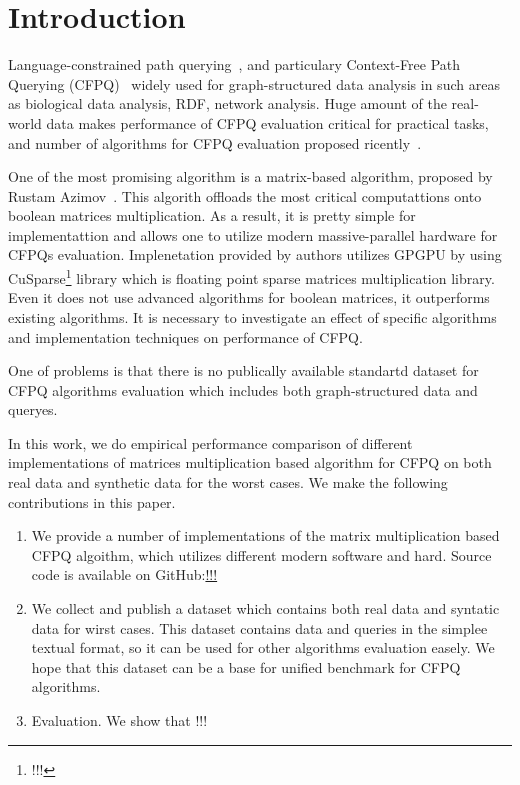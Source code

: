 \section{Introduction}

Language-constrained path querying~\cite{!!!}, and particulary Context-Free Path Querying (CFPQ)~\cite{!!!} widely used for graph-structured data analysis in such areas as biological data analysis, RDF, network analysis.
Huge amount of the real-world data makes performance of CFPQ evaluation critical for practical tasks, and number of algorithms for CFPQ evaluation proposed ricently~\cite{!!!}.

One of the most promising algorithm is a matrix-based algorithm, proposed by Rustam Azimov~\cite{!!!}.
This algorith offloads the most critical computattions onto boolean matrices multiplication.
As a result, it is pretty simple for implementattion and allows one to utilize modern massive-parallel hardware for CFPQs evaluation.
Implenetation provided by authors utilizes GPGPU by using CuSparse\footnote{!!!} library which is floating point sparse matrices multiplication library.
Even it does not use advanced algorithms for boolean matrices, it outperforms existing algorithms.
It is necessary to investigate an effect of specific algorithms and implementation techniques on performance of CFPQ.

One of problems is that there is no publically available standartd dataset for CFPQ algorithms evaluation which includes both graph-structured data and queryes.

In this work, we do empirical performance comparison of different implementations of matrices multiplication based algorithm for CFPQ on both real data and synthetic data for the worst cases.
We make the following contributions in this paper.

\begin{enumerate}
\item We provide a number of implementations of the matrix multiplication based CFPQ algoithm, which utilizes different modern software and hard. Source code is available on GitHub:\url{!!!}
\item We collect and publish a dataset which contains both real data and syntatic data for wirst cases.
This dataset contains data and queries in the simplee textual format, so it can be used for other algorithms evaluation easely.
We hope that this dataset can be a base for unified benchmark for CFPQ algorithms.
\item Evaluation. We show that !!!
\end{enumerate}
